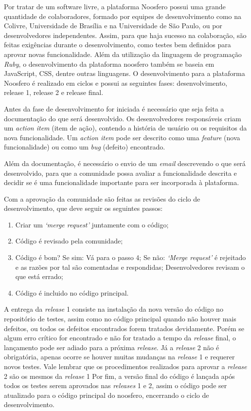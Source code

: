 Por tratar de um software livre, a plataforma Noosfero possui uma grande quantidade 
de colaboradores, formado por equipes de desenvolvimento como na Colivre, Universidade de Brasília e na Universidade de São Paulo, ou por desenvolvedores independentes.
%
Assim, para que haja sucesso na colaboração, são feitas exigências durante o desenvolvimento, como testes bem definidos para aprovar novas funcionalidade.
%
Além da utilização da linguagem de programação \textit{Ruby}, o desenvolvimento da plataforma noosfero também se baseia em JavaScript, CSS, dentre outras linguagens.
%
O desenvolvimento para a plataforma Noosfero é realizado em ciclos e
possui as seguintes fases: desenvolvimento, release 1, release 2 e release final.

Antes da fase de desenvolvimento for iniciada é necessário que seja feita a 
documentação do que será desenvolvido.
%
Os desenvolvedores responsáveis criam um \textit{action item} (item de ação), contendo a história de usuário ou os requisitos da nova funcionalidade. Um \textit{action item} pode ser descrito como uma \textit{feature} (nova funcionalidade) ou como um \textit{bug} (defeito) encontrado.


Além da documentação, é necessário o envio de um \textit{email} descrevendo o que será desenvolvido, para que a comunidade possa avaliar a funcionalidade descrita e decidir se é uma funcionalidade importante para ser incorporada à plataforma.

Com a aprovação da comunidade são feitas as revisões do ciclo de desenvolvimento, 
que deve seguir os seguintes passos:
%
\begin{enumerate}
\item Criar um \textit{‘merge request’} juntamente com o código;
\item Código é revisado pela comunidade;
\item Código é bom? 
\subitem Se sim:
\subsubitem Vá para o passo 4;
\subitem Se não:
\subsubitem \textit{‘Merge request’} é rejeitado e as razões por tal são comentadas e 
respondidas;
\subsubitem Desenvolvedores revisam o que está errado;
\item Código é incluido no código principal.
\end{enumerate}

A entrega da \textit{release} 1 consiste na instalação da nova versão do código no repositório de testes, assim como no código principal quando não houver mais defeitos, ou todos os defeitos encontrados forem tratados devidamente. Porém se algum erro crítico for encontrado e não for tratado a tempo da \textit{release} final, o lançamento pode ser adiado para a próxima \textit{release}.
%
Já a \textit{release} 2 não é obrigatória, apenas ocorre se houver muitas mudanças na \textit{release} 1 e requerer novos testes. Vale lembrar que os procedimentos realizados para aprovar a \textit{release} 2 são os mesmos da \textit{release} 1
%
Por fim, a versão final do código é lançada após todos os testes serem aprovados nas \textit{releases} 1 e 2, assim o código pode ser atualizado para o código principal do noosfero, encerrando o ciclo de desenvolvimento.


